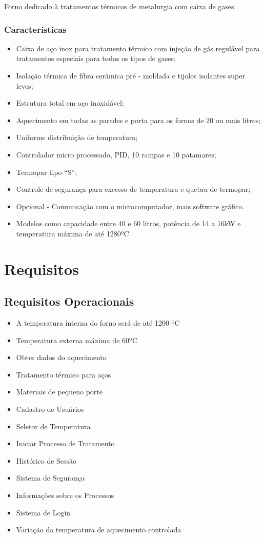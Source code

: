Forno dedicado à tratamentos térmicos de metalurgia com caixa de gases.

\subsubsection{Características}

\begin{itemize}
	\item Caixa de aço inox para tratamento térmico com injeção de gás regulável para tratamentos especiais para todos os tipos de gases;
	\item Isolação térmica de fibra cerâmica pré - moldada e tijolos isolantes super leves;
	\item Estrutura total em aço inoxidável;
	\item Aquecimento em todas as paredes e porta para os fornos de 20 ou mais litros;
	\item Uniforme distribuição de temperatura;
	\item Controlador micro processado, PID, 10 rampas e 10 patamares;
	\item Termopar tipo “S”;
	\item Controle de segurança para excesso de temperatura e quebra de termopar;
	\item Opcional - Comunicação com o microcomputador, mais software gráfico.
	\item Modelos como capacidade entre 40 e 60 litros, potência de 14 a 16kW e temperatura máxima de até 1280ºC
	
\end{itemize}

\section{Requisitos}

\subsection{Requisitos Operacionais}

\begin{itemize}
	\item A temperatura interna do forno será de até 1200 ºC
	\item Temperatura externa máxima de 60ºC
	\item Obter dados do aquecimento
	\item Tratamento térmico para aços
	\item Materiais de pequeno porte
	\item Cadastro de Usuários
	\item Seletor de Temperatura
	\item Iniciar Processo de Tratamento
	\item Histórico de Sessão
	\item Sistema de Segurança
	\item Informações sobre os Processos
	\item Sistema de Login
	\item Variação da temperatura de aquecimento controlada
\end{itemize}

